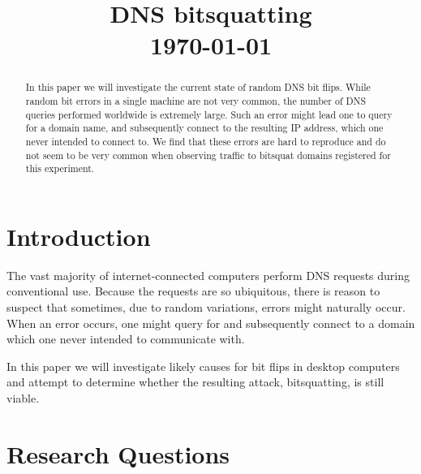 \documentclass[conference]{IEEEtran}
\begin{document}
\title{DNS bitsquatting\\\vspace{5mm} \large  \today}
\author{
\and
{}
}
\maketitle
\thispagestyle{plain}
\pagestyle{plain}

\begin{abstract}

	In this paper we will investigate the current state of random DNS bit
	flips. While random bit errors in a single machine are not very common, the
	number of DNS queries performed worldwide is extremely large. Such an error
	might lead one to query for a domain name, and subsequently connect to the
	resulting IP address, which one never intended to connect to. We find that
	these errors are hard to reproduce and do not seem to be very common when
	observing traffic to bitsquat domains registered for this experiment.

\end{abstract}

\section{Introduction}

The vast majority of internet-connected computers perform DNS requests during
conventional use. Because the requests are so ubiquitous, there is reason to
suspect that sometimes, due to random variations, errors might naturally occur.
When an error occurs, one might query for and subsequently connect to a domain
which one never intended to communicate with.

In this paper we will investigate likely causes for bit flips in desktop
computers and attempt to determine whether the resulting attack, bitsquatting,
is still viable.



\section{Research Questions}\label{sec:researchq}
\end{document}
